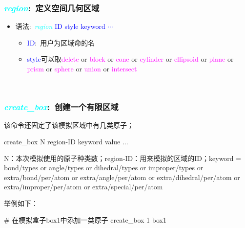 \frame
{
	\frametitle{\textcolor{cyan}{\textit{region}}:~定义空间几何区域}
	\begin{itemize}
		\item 语法:~\textcolor{cyan}{\textit{region}} \textrm{\textcolor{blue}{ID style keyword $\cdots$}}
			\begin{itemize}
				\item \textrm{\textcolor{blue}{ID}}:~用户为区域命的名
				\item \textrm{\textcolor{blue}{style}}可以取\textrm{\textcolor{magenta}{delete} or \textcolor{magenta}{block} or \textcolor{magenta}{cone} or \textcolor{magenta}{cylinder} or \textcolor{magenta}{ellipsoid} or \textcolor{magenta}{plane} or \textcolor{magenta}{prism} or \textcolor{magenta}{sphere} or \textcolor{magenta}{union} or \textcolor{magenta}{intersect}}
					\begin{itemize}
{\fontsize{7.5pt}{5.2pt}}
					\end{itemize}
			\end{itemize}
	\end{itemize}
{\fontsize{7.5pt}{5.2pt}}\\
{\fontsize{6.2pt}{5.2pt}}
}

\frame
{
	\frametitle{\textcolor{cyan}{\textit{create\_box}}:~创建一个有限区域}
	该命令还固定了该模拟区域中有几类原子；

create_box N region-ID keyword value ...

    N：本次模拟使用的原子种类数；region-ID：用来模拟的区域的ID；keyword = bond/types or angle/types or dihedral/types or improper/types or extra/bond/per/atom or extra/angle/per/atom or extra/dihedral/per/atom or extra/improper/per/atom or extra/special/per/atom

举例如下：

# 在模拟盒子box1中添加一类原子
create_box 1 box1
}

